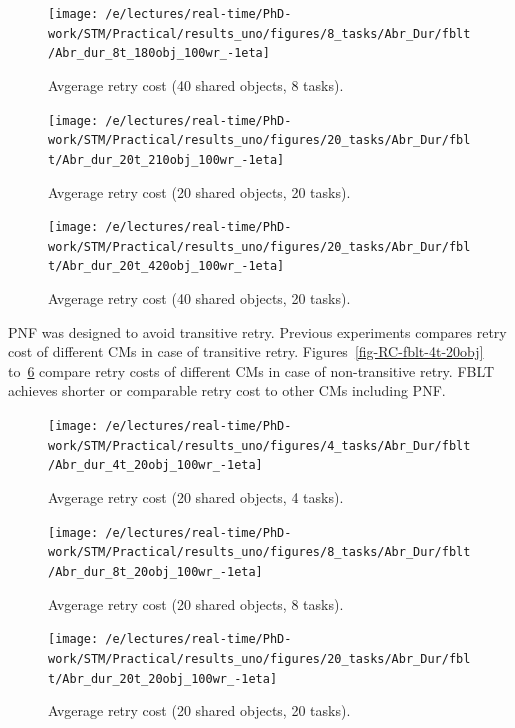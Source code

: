 \documentclass[a4paper,english]{article}
\begin{document}
\begin{figure}[!htpd]
\centering
\texttt{[image: /e/lectures/real-time/PhD-work/STM/Practical/results\_uno/figures/8\_tasks/Abr\_Dur/fblt/Abr\_dur\_8t\_180obj\_100wr\_-1eta]}
\caption{Avgerage retry cost (40 shared objects, 8 tasks).}
\label{fig-RC-fblt-8t-40obj}
\end{figure}

\begin{figure}[!htpd]
\centering
\texttt{[image: /e/lectures/real-time/PhD-work/STM/Practical/results\_uno/figures/20\_tasks/Abr\_Dur/fblt/Abr\_dur\_20t\_210obj\_100wr\_-1eta]}
\caption{Avgerage retry cost (20 shared objects, 20 tasks).}
\label{fig-RC-fblt-20t-20obj}
\end{figure}

\begin{figure}[!htpd]
\centering
\texttt{[image: /e/lectures/real-time/PhD-work/STM/Practical/results\_uno/figures/20\_tasks/Abr\_Dur/fblt/Abr\_dur\_20t\_420obj\_100wr\_-1eta]}
\caption{Avgerage retry cost (40 shared objects, 20 tasks).}
\label{fig-RC-fblt-20t-40obj}
\end{figure}

PNF was designed to avoid transitive retry. Previous experiments compares retry cost of different CMs in case of transitive retry. Figures~\ref{fig-RC-fblt-4t-20obj} to~\ref{fig-RC-fblt-20t-20obj}  compare retry costs of different CMs in case of non-transitive retry. FBLT achieves shorter or comparable retry cost to other CMs including PNF.

\begin{figure}[!htpd]
\centering
\texttt{[image: /e/lectures/real-time/PhD-work/STM/Practical/results\_uno/figures/4\_tasks/Abr\_Dur/fblt/Abr\_dur\_4t\_20obj\_100wr\_-1eta]}
\caption{Avgerage retry cost (20 shared objects, 4 tasks).}
\label{fig-RC-fblt-20t-20obj}
\end{figure}

\begin{figure}[!htpd]
\centering
\texttt{[image: /e/lectures/real-time/PhD-work/STM/Practical/results\_uno/figures/8\_tasks/Abr\_Dur/fblt/Abr\_dur\_8t\_20obj\_100wr\_-1eta]}
\caption{Avgerage retry cost (20 shared objects, 8 tasks).}
\label{fig-RC-fblt-8t-20obj}
\end{figure}

\begin{figure}[!htpd]
\centering
\texttt{[image: /e/lectures/real-time/PhD-work/STM/Practical/results\_uno/figures/20\_tasks/Abr\_Dur/fblt/Abr\_dur\_20t\_20obj\_100wr\_-1eta]}
\caption{Avgerage retry cost (20 shared objects, 20 tasks).}
\label{fig-RC-fblt-20t-20obj}
\end{figure}
\end{document}
